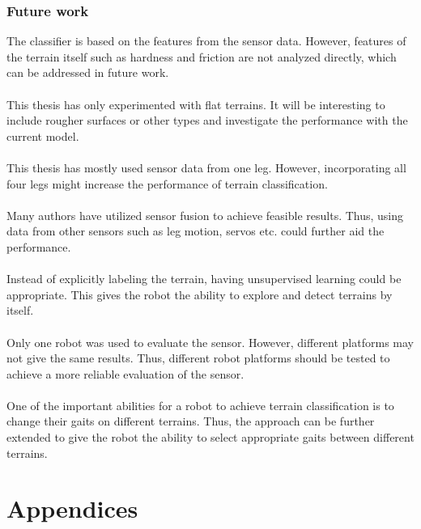 \documentclass[USenglish]{ifimaster}  %
\begin{document}
\section{Future work}
The classifier is based on the features from the sensor data. However, features of the terrain itself such as hardness and friction are not analyzed directly, which can be addressed in future work. 
\\
\\
This thesis has only experimented with flat terrains. It will be interesting to include rougher surfaces or other types and investigate the performance with the current model. 
\\
\\
This thesis has mostly used sensor data from one leg. However, incorporating all four legs might increase the performance of terrain classification. 
\\
\\
Many authors have utilized sensor fusion to achieve feasible results. Thus, using data from other sensors such as leg motion, servos etc. could further aid the performance.
\\
\\
Instead of explicitly labeling the terrain, having unsupervised learning could be appropriate. This gives the robot the ability to explore and detect terrains by itself.
\\
\\
Only one robot was used to evaluate the sensor. However, different platforms may not give the same results. Thus, different robot platforms should be tested to achieve a more reliable evaluation of the sensor.
\\
\\
One of the important abilities for a robot to achieve terrain classification is to change their gaits on different terrains. Thus, the approach can be further extended to give the robot the ability to select appropriate gaits between different terrains.

	


\backmatter{}



\part*{Appendices} 
\appendix
\end{document}
